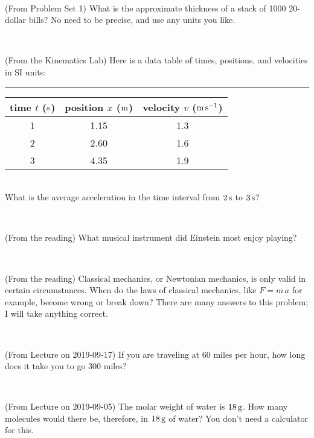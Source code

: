 \documentclass[12pt, letterpaper]{article}
\begin{document}
\vfill ~

\begin{problem} (From Problem Set 1)
What is the approximate thickness of a stack of 1000 20-dollar bills?
No need to be precise, and use any units you like.
\end{problem}


\vfill ~

\begin{problem} (From the Kinematics Lab)
Here is a data table of times, positions, and velocities in SI units:\\
\rule{1.0in}{0pt}\begin{tabular}{c|c|c}
time $t$ ($\mathrm{s}$) & position $x$ ($\mathrm{m}$) & velocity $v$ ($\mathrm{m}\,\mathrm{s}^{-1}$) \\
\hline
1 & 1.15 & 1.3 \\
2 & 2.60 & 1.6 \\
3 & 4.35 & 1.9 \\
\hline
\end{tabular}\\
What is the average acceleration in the time interval from $2\,\mathrm{s}$ to $3\,\mathrm{s}$?
\end{problem}


\vfill ~

\begin{problem} (From the reading)
What musical instrument did Einstein most enjoy playing?
\end{problem}


\vfill ~


\clearpage


\begin{problem} (From the reading)
Classical mechanics, or Newtonian mechanics, is only valid in certain
circumstances. When do the laws of classical mechanics, like $F =
m\,a$ for example, become wrong or break down? There are many answers
to this problem; I will take anything correct.
\end{problem}


\vfill ~

\begin{problem} (From Lecture on 2019-09-17)
If you are traveling at 60 miles per hour, how long does
it take you to go 300 miles?
\end{problem}


\vfill ~

\begin{problem} (From Lecture on 2019-09-05)
The molar weight of water is $18\,\mathrm{g}$. How many molecules would there
be, therefore, in $18\,\mathrm{g}$ of water? You don't need a calculator for
this.
\end{problem}
\end{document}
